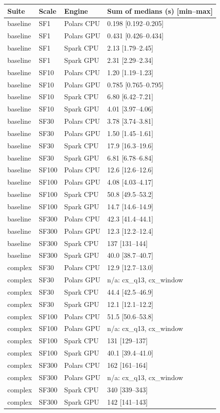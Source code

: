 \begin{tabular}{llll}
\toprule
Suite & Scale & Engine & Sum of medians (s) [min--max] \\
\midrule
baseline & SF1 & Polars CPU & 0.198 [0.192--0.205] \\
baseline & SF1 & Polars GPU & 0.431 [0.426--0.434] \\
baseline & SF1 & Spark CPU & 2.13 [1.79--2.45] \\
baseline & SF1 & Spark GPU & 2.31 [2.29--2.34] \\
baseline & SF10 & Polars CPU & 1.20 [1.19--1.23] \\
baseline & SF10 & Polars GPU & 0.785 [0.765--0.795] \\
baseline & SF10 & Spark CPU & 6.80 [6.42--7.21] \\
baseline & SF10 & Spark GPU & 4.01 [3.97--4.06] \\
baseline & SF30 & Polars CPU & 3.78 [3.74--3.81] \\
baseline & SF30 & Polars GPU & 1.50 [1.45--1.61] \\
baseline & SF30 & Spark CPU & 17.9 [16.3--19.6] \\
baseline & SF30 & Spark GPU & 6.81 [6.78--6.84] \\
baseline & SF100 & Polars CPU & 12.6 [12.6--12.6] \\
baseline & SF100 & Polars GPU & 4.08 [4.03--4.17] \\
baseline & SF100 & Spark CPU & 50.8 [49.5--53.2] \\
baseline & SF100 & Spark GPU & 14.7 [14.6--14.9] \\
baseline & SF300 & Polars CPU & 42.3 [41.4--44.1] \\
baseline & SF300 & Polars GPU & 12.3 [12.2--12.4] \\
baseline & SF300 & Spark CPU & 137 [131--144] \\
baseline & SF300 & Spark GPU & 40.0 [38.7--40.7] \\
complex & SF30 & Polars CPU & 12.9 [12.7--13.0] \\
complex & SF30 & Polars GPU & n/a: cx\_q13, cx\_window \\
complex & SF30 & Spark CPU & 44.4 [42.5--46.9] \\
complex & SF30 & Spark GPU & 12.1 [12.1--12.2] \\
complex & SF100 & Polars CPU & 51.5 [50.6--53.8] \\
complex & SF100 & Polars GPU & n/a: cx\_q13, cx\_window \\
complex & SF100 & Spark CPU & 131 [129--137] \\
complex & SF100 & Spark GPU & 40.1 [39.4--41.0] \\
complex & SF300 & Polars CPU & 162 [161--164] \\
complex & SF300 & Polars GPU & n/a: cx\_q13, cx\_window \\
complex & SF300 & Spark CPU & 340 [339--343] \\
complex & SF300 & Spark GPU & 142 [141--143] \\
\bottomrule
\end{tabular}
